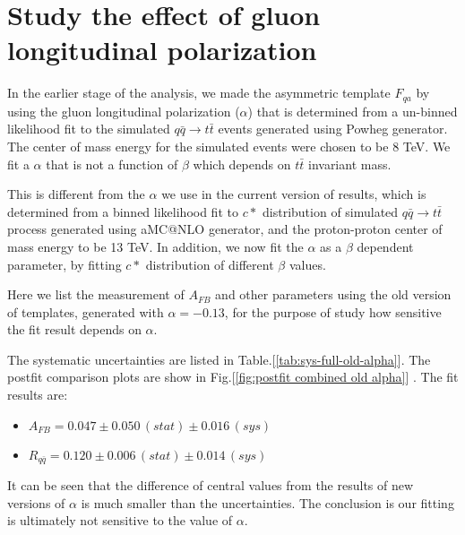 \documentclass{cmspaperpdf}
\begin{document}
\clearpage
\section{Study the effect of gluon longitudinal polarization}
In the earlier stage of the analysis, we made the asymmetric template $F_{qa}$ by using the gluon longitudinal polarization ($\alpha$) that is determined from a un-binned likelihood fit to the simulated $q\bar{q}\rightarrow t\bar{t}$ events generated using Powheg generator. The center of mass energy for the simulated events were chosen to be 8 TeV. We fit a $\alpha$ that is not a function of $\beta$ which depends on $t\bar{t}$ invariant mass.

This is different from the $\alpha$ we use in the current version of results, which is determined from a binned likelihood fit to $c*$ distribution of simulated $q\bar{q}\rightarrow t\bar{t}$ process generated using aMC@NLO generator, and the proton-proton center of mass energy to be 13 TeV. In addition, we now fit the $\alpha$ as a $\beta$ dependent parameter, by fitting $c*$ distribution of different $\beta$ values.

Here we list the measurement of $A_{FB}$ and other parameters using the old version of templates, generated with $\alpha=-0.13$, for the purpose of study how sensitive the fit result depends on $\alpha$.

The systematic uncertainties are listed in Table.[\ref{tab:sys-full-old-alpha}]. The postfit comparison plots are show in Fig.[\ref{fig:postfit combined old alpha}] .  The fit results are:
\begin{itemize}
\item $ A_{FB} = 0.047  \pm 0.050 \, (stat) \pm 0.016 \, (sys)$
\item $ R_{q\bar{q}} = 0.120  \pm 0.006 \, (stat) \pm 0.014 \, (sys) $
\end{itemize}

It can be seen that the difference of central values from the results of new versions of $\alpha$ is much smaller than the uncertainties. The conclusion is our fitting is ultimately not sensitive to the value of $\alpha$.
\end{document}
